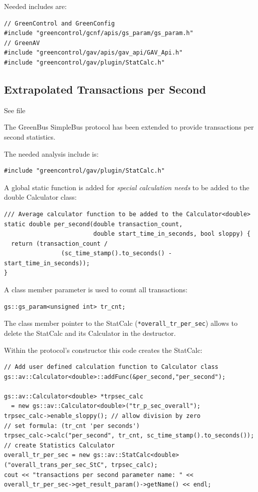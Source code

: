 Needed includes are:
\begin{lstlisting}
// GreenControl and GreenConfig
#include "greencontrol/gcnf/apis/gs_param/gs_param.h"
// GreenAV
#include "greencontrol/gav/apis/gav_api/GAV_Api.h"
#include "greencontrol/gav/plugin/StatCalc.h"
\end{lstlisting}


\subsection{Extrapolated Transactions per Second}

See file 

The GreenBus SimpleBus protocol has been extended to provide transactions per second statistics.

The needed analysis include is:
\begin{lstlisting}
#include "greencontrol/gav/plugin/StatCalc.h"
\end{lstlisting}

A global static function is added for {\em special calculation needs} to be added to the double Calculator class:
\begin{lstlisting}
/// Average calculator function to be added to the Calculator<double>
static double per_second(double transaction_count, 
                         double start_time_in_seconds, bool sloppy) {
  return (transaction_count / 
                (sc_time_stamp().to_seconds() - start_time_in_seconds));
}
\end{lstlisting}

A class member parameter is used to count all transactions:
\begin{lstlisting}
gs::gs_param<unsigned int> tr_cnt;
\end{lstlisting}

The class member pointer to the StatCalc (\lstinline|*overall_tr_per_sec|) allows to delete the StatCalc and its Calculator in the destructor.

Within the protocol's constructor this code creates the StatCalc:
\begin{lstlisting}
// Add user defined calculation function to Calculator class
gs::av::Calculator<double>::addFunc(&per_second,"per_second"); 
    
gs::av::Calculator<double> *trpsec_calc
  = new gs::av::Calculator<double>("tr_p_sec_overall");
trpsec_calc->enable_sloppy(); // allow division by zero
// set formula: (tr_cnt 'per seconds')
trpsec_calc->calc("per_second", tr_cnt, sc_time_stamp().to_seconds()); 
// create Statistics Calculator
overall_tr_per_sec = new gs::av::StatCalc<double>("overall_trans_per_sec_StC", trpsec_calc); 
cout << "transactions per second parameter name: " << overall_tr_per_sec->get_result_param()->getName() << endl;
\end{lstlisting}

